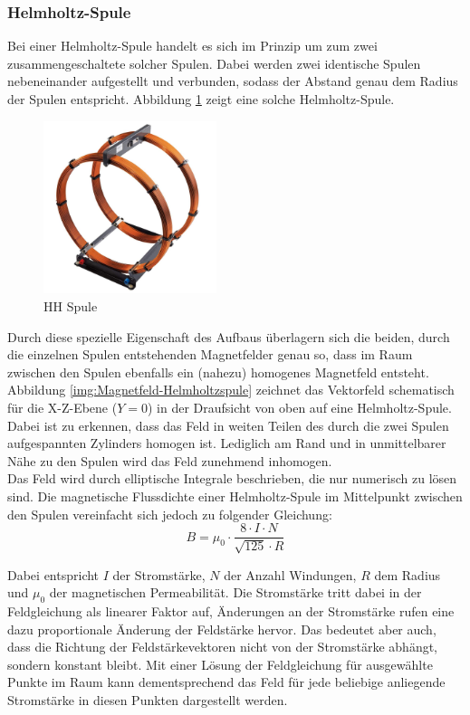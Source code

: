 \subsubsection{Helmholtz-Spule}
Bei einer Helmholtz-Spule handelt es sich im Prinzip um zum zwei zusammengeschaltete solcher Spulen. Dabei werden zwei identische Spulen nebeneinander aufgestellt und verbunden, sodass der Abstand genau dem Radius der Spulen entspricht. Abbildung \ref{img:Helmholtz} zeigt eine solche Helmholtz-Spule.\\

\begin{figure}[h!]
	\centering
	\includegraphics[width=0.45\textwidth]{images/Helmholtz.jpg}
	\caption{HH Spule}
	\label{img:Helmholtz}
\end{figure}

Durch diese spezielle Eigenschaft des Aufbaus überlagern sich die beiden, durch die einzelnen Spulen entstehenden Magnetfelder genau so, dass im Raum zwischen den Spulen ebenfalls ein (nahezu) homogenes Magnetfeld entsteht. Abbildung \ref{img:Magnetfeld-Helmholtzspule} zeichnet das Vektorfeld schematisch für die X-Z-Ebene ($Y=0$) in der Draufsicht von oben auf eine Helmholtz-Spule. Dabei ist zu erkennen, dass das Feld in weiten Teilen des durch die zwei Spulen aufgespannten Zylinders homogen ist. Lediglich am Rand und in unmittelbarer Nähe zu den Spulen wird das Feld zunehmend inhomogen.\\

Das Feld wird durch elliptische Integrale beschrieben, die nur numerisch zu lösen sind.
Die magnetische Flussdichte einer Helmholtz-Spule im Mittelpunkt zwischen den Spulen vereinfacht sich jedoch zu folgender Gleichung:
\begin{equation}
	\label{eq:mfield}
	B = \mu_{0} \cdot \frac{8 \cdot I \cdot N}{\sqrt{125} \cdot R}
\end{equation}

Dabei entspricht $I$ der Stromstärke, $N$ der Anzahl Windungen, $R$ dem Radius und $\mu_{0}$ der magnetischen Permeabilität. Die Stromstärke tritt dabei in der Feldgleichung als linearer Faktor auf, Änderungen an der Stromstärke rufen eine dazu proportionale Änderung der Feldstärke hervor. Das bedeutet aber auch, dass die Richtung der Feldstärkevektoren nicht von der Stromstärke abhängt, sondern konstant bleibt. Mit einer Lösung der Feldgleichung für ausgewählte Punkte im Raum kann dementsprechend das Feld für jede beliebige anliegende Stromstärke in diesen Punkten dargestellt werden.\\

